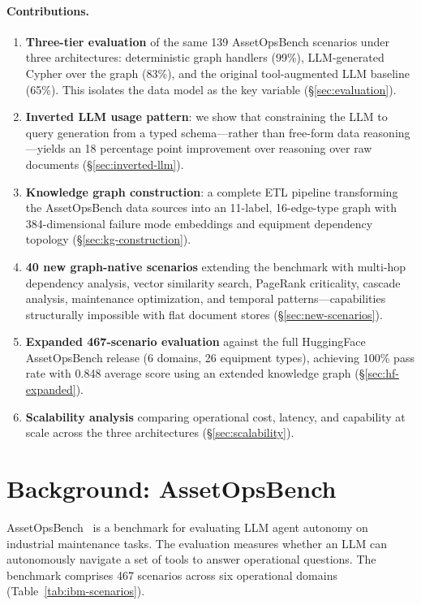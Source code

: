 \documentclass[11pt]{article}
\begin{document}
\paragraph{Contributions.}
\begin{enumerate}[leftmargin=*]
  \item \textbf{Three-tier evaluation} of the same 139 AssetOpsBench scenarios under three architectures: deterministic graph handlers (99\%), LLM-generated Cypher over the graph (83\%), and the original tool-augmented LLM baseline (65\%). This isolates the data model as the key variable (\S\ref{sec:evaluation}).
  \item \textbf{Inverted LLM usage pattern}: we show that constraining the LLM to query generation from a typed schema---rather than free-form data reasoning---yields an 18 percentage point improvement over reasoning over raw documents (\S\ref{sec:inverted-llm}).
  \item \textbf{Knowledge graph construction}: a complete ETL pipeline transforming the AssetOpsBench data sources into an 11-label, 16-edge-type graph with 384-dimensional failure mode embeddings and equipment dependency topology (\S\ref{sec:kg-construction}).
  \item \textbf{40 new graph-native scenarios} extending the benchmark with multi-hop dependency analysis, vector similarity search, PageRank criticality, cascade analysis, maintenance optimization, and temporal patterns---capabilities structurally impossible with flat document stores (\S\ref{sec:new-scenarios}).
  \item \textbf{Expanded 467-scenario evaluation} against the full HuggingFace AssetOpsBench release (6 domains, 26 equipment types), achieving 100\% pass rate with 0.848 average score using an extended knowledge graph (\S\ref{sec:hf-expanded}).
  \item \textbf{Scalability analysis} comparing operational cost, latency, and capability at scale across the three architectures (\S\ref{sec:scalability}).
\end{enumerate}

\section{Background: AssetOpsBench}
\label{sec:background}

AssetOpsBench~\citep{ibm2025assetopsbench} is a benchmark for evaluating LLM agent autonomy on industrial maintenance tasks. The evaluation measures whether an LLM can autonomously navigate a set of tools to answer operational questions. The benchmark comprises 467 scenarios across six operational domains (Table~\ref{tab:ibm-scenarios}).
\end{document}
